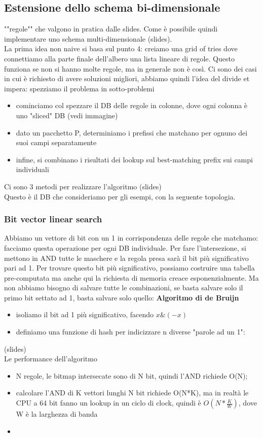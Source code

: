 \documentclass[12pt, oneside]{extbook} %
\begin{document}
\subsection{Estensione dello schema bi-dimensionale}
""regole"" che valgono in pratica dalle slides. Come è  possibile quindi implementare uno schema multi-dimensionale (slides).\\ La prima idea non naive si basa sul punto 4: creiamo una grid of tries dove connettiamo alla parte finale dell'albero una lista lineare di regole. Questo funziona se non si hanno molte regole, ma in generale non è così. Ci sono dei casi in cui è richiesto di avere soluzioni migliori, abbiamo quindi l'idea del divide et impera: spezziamo il problema in sotto-problemi
\begin{itemize}
\item cominciamo col spezzare il DB delle regole in colonne, dove ogni colonna è uno "sliced" DB (vedi immagine)
\item dato un pacchetto P, determiniamo i prefissi che matchano per ognuno dei suoi campi separatamente
\item infine, si combinano i risultati dei lookup sul best-matching prefix sui campi individuali
\end{itemize}
Ci sono 3 metodi per realizzare l'algoritmo (slides)\\
Questo è il DB che consideriamo per gli esempi, con la seguente topologia.
\subsubsection{Bit vector linear search}
Abbiamo un vettore di bit con un 1 in corrispondenza delle regole che matchamo: 
facciamo questa operazione per ogni DB individuale. Per fare l'intersezione, si mettono in AND tutte le maschere e la regola presa sarà il bit più significativo pari ad 1. Per trovare questo bit più significativo, possiamo costruire una tabella pre-computata ma anche qui la richiesta di memoria creace esponenzialmente. Ma non abbiamo bisogno di salvare tutte le combinazioni, se basta salvare solo il primo bit settato ad 1, basta salvare solo quello: \textbf{Algoritmo di de Bruijn}
\begin{itemize}
\item isoliamo il bit ad 1 più significativo, facendo $x \& (-x)$
\item definiamo una funzione di hash per indicizzare n diverse "parole ad un 1":
\end{itemize}
(slides)\\
Le performance dell'algoritmo
\begin{itemize}
\item N regole, le bitmap intersecate sono di N bit, quindi l'AND richiede O(N);
\item calcolare l'AND di K vettori lunghi N bit richiede O(N*K), ma in realtà le CPU a 64 bit fanno un lookup in un ciclo di clock, quindi è $O(N*\frac{K}{W})$, dove W è la larghezza di banda
\item 
\end{itemize}
\end{document}
